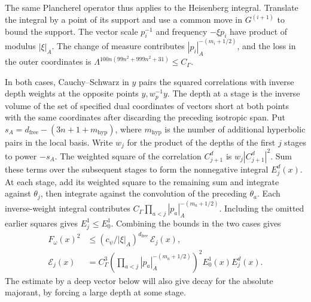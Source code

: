 The same Plancherel operator thus applies to the Heisenberg integral.
Translate the integral by a point of its support and use a common
move in \(G^{(i+1)}\) to bound the support. The vector scale \(p_i^{-1}\)
and frequency \(-\xi p_i\) have product of modulus \(|\xi|_A\).
The change of measure contributes \(|p_i|_A^{-(m_i+1/2)}\), and the
loss in the outer coordinates is
\(\Lambda^{100n(99n^2+999n^2+31)}\le C_\Gamma\).

In both cases, Cauchy--Schwarz in \(y\) pairs the squared correlations
with inverse depth weights at the opposite points \(y,w_p^{-1}y\).
The depth at a stage is the inverse volume of the set of specified
dual coordinates of vectors short at both points with the same
coordinates after discarding the preceding isotropic span.
Put \(s_A=d_{\mathrm{free}}-(3n+1+m_\mathrm{hyp})\), where
\(m_\mathrm{hyp}\) is the number of additional hyperbolic pairs in
the local basis. Write \(w_j\) for the product of the depths of the
first \(j\) stages to power \(-s_A\). The weighted square of the
correlation \(C_{j+1}^d\) is \(w_j|C_{j+1}^d|^2\). Sum these terms
over the subsequent stages to form the nonnegative integral
\(E_j^d(x)\). At each stage, add its weighted square to the remaining
sum and integrate against \(\theta_j\), then integrate against the
convolution of the preceding \(\theta_a\).
Each inverse-weight integral contributes
\(C_\Gamma\prod_{a<j}|p_a|_A^{-(m_a+1/2)}\).
Including the omitted earlier squares gives \(E_j^1\le E_0^1\).
Combining the bounds in the two cases gives
\begin{equation}\label{eq:span-local-pointwise}
 \begin{split}
 F_\omega(x)^2
 &\le (c_\psi/|\xi|_A)^{d_{\mathrm{free}}}\,\mathcal E_j(x),\\
 \mathcal E_j(x)&=
  C_\Gamma^3\left(\prod_{a<j}|p_a|_A^{-(m_a+1/2)}\right)^2
  E_0^1(x)E_j^d(x).
 \end{split}
\end{equation}
The estimate by a deep vector below will also give decay for the
absolute majorant, by forcing a large depth at some stage.

